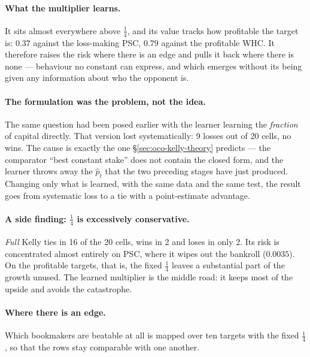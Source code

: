 \documentclass[12pt,a4paper,oneside]{report}
\renewcommand{\_}{\oldunderscore\allowbreak}
\theoremstyle{definition}
\theoremstyle{plain}
\theoremstyle{remark}
\begin{document}
\paragraph{What the multiplier learns.} It sits almost everywhere above $\tfrac14$, and its value
tracks how profitable the target is: $0.37$ against the loss-making PSC, $0.79$ against the
profitable WHC. It therefore raises the risk where there is an edge and pulls it back where there
is none --- behaviour no constant can express, and which emerges without its being given any
information about who the opponent is.

\paragraph{The formulation was the problem, not the idea.} The same question had been posed
earlier with the learner learning the \emph{fraction} of capital directly. That version lost
systematically: 9 losses out of 20 cells, no wins. The cause is exactly the one
\S\ref{sec:oco-kelly-theory} predicts --- the comparator ``best constant stake'' does not contain
the closed form, and the learner throws away the $\hat{p}_t$ that the two preceding stages have
just produced. Changing only what is learned, with the same data and the same test, the result
goes from systematic loss to a tie with a point-estimate advantage.

\paragraph{A side finding: $\tfrac14$ is excessively conservative.} \emph{Full} Kelly ties in 16 of
the 20 cells, wins in 2 and loses in only 2. Its risk is concentrated almost entirely on PSC,
where it wipes out the bankroll ($0.0035$). On the profitable targets, that is, the fixed
$\tfrac14$ leaves a substantial part of the growth unused. The learned multiplier is the middle
road: it keeps most of the upside and avoids the catastrophe.

\paragraph{Where there is an edge.} Which bookmakers are beatable at all is mapped over ten
targets with the fixed $\tfrac14$, so that the rows stay comparable with one another.
\end{document}
